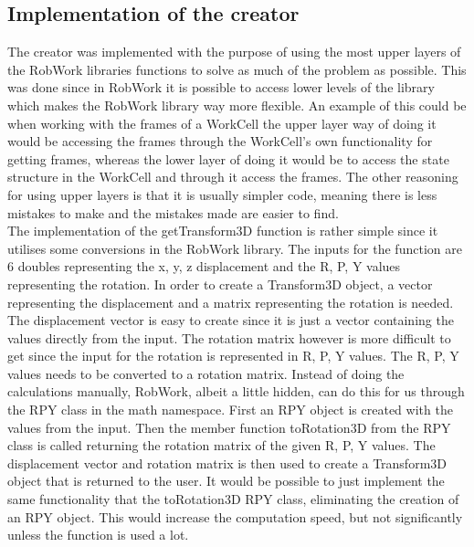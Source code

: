 \subsection{Implementation of the creator}
The creator was implemented with the purpose of using the most upper layers of the RobWork libraries functions to solve as much of the problem as possible. This was done since in RobWork it is possible to access lower levels of the library which makes the RobWork library way more flexible. An example of this could be when working with the frames of a WorkCell the upper layer way of doing it would be accessing the frames through the WorkCell's own functionality for getting frames, whereas the lower layer of doing it would be to access the state structure in the WorkCell and through it access the frames. The other reasoning for using upper layers is that it is usually simpler code, meaning there is less mistakes to make and the mistakes made are easier to find.\\

The implementation of the getTransform3D function is rather simple since it utilises some conversions in the RobWork library. The inputs for the function are 6 doubles representing the x, y, z displacement and the R, P, Y values representing the rotation. In order to create a Transform3D object, a vector representing the displacement and a matrix representing the rotation is needed. The displacement vector is easy to create since it is just a vector containing the values directly from the input. The rotation matrix however is more difficult to get since the input for the rotation is represented in R, P, Y values. The R, P, Y values needs to be converted to a rotation matrix. Instead of doing the calculations manually, RobWork, albeit a little hidden, can do this for us through the RPY class in the math namespace. First an RPY object is created with the values from the input. Then the member function toRotation3D from the RPY class is called returning the rotation matrix of the given R, P, Y values. The displacement vector and rotation matrix is then used to create a Transform3D object that is returned to the user. It would be possible to just implement the same functionality that the toRotation3D RPY class, eliminating the creation of an RPY object. This would increase the computation speed, but not significantly unless the function is used a lot.

